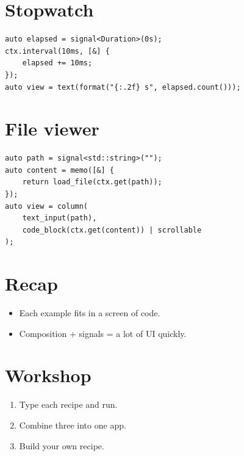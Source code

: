 \section{Stopwatch}

\begin{lstlisting}
auto elapsed = signal<Duration>(0s);
ctx.interval(10ms, [&] {
    elapsed += 10ms;
});
auto view = text(format("{:.2f} s", elapsed.count()));
\end{lstlisting}

\section{File viewer}

\begin{lstlisting}
auto path = signal<std::string>("");
auto content = memo([&] {
    return load_file(ctx.get(path));
});
auto view = column(
    text_input(path),
    code_block(ctx.get(content)) | scrollable
);
\end{lstlisting}

\section{Recap}

\begin{recap}
\begin{itemize}[leftmargin=*]
  \item Each example fits in a screen of code.
  \item Composition + signals = a lot of UI quickly.
\end{itemize}
\end{recap}

\section*{Workshop}

\begin{enumerate}[leftmargin=*]
  \item Type each recipe and run.
  \item Combine three into one app.
  \item Build your own recipe.
\end{enumerate}

